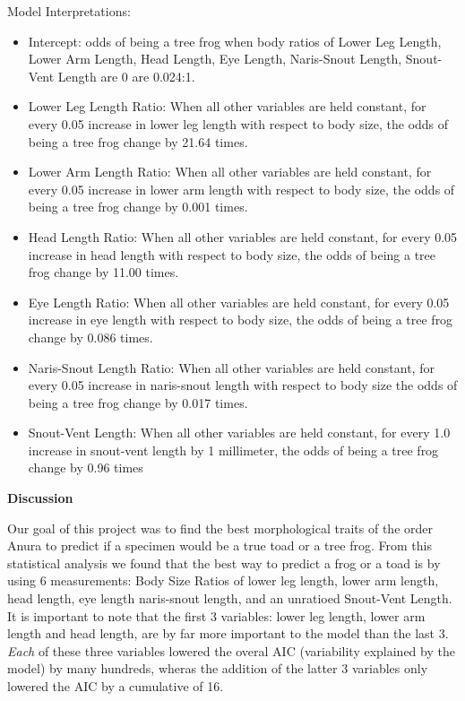 \documentclass[
]{article}
\begin{document}
Model Interpretations:

\begin{itemize}
\item
  Intercept: odds of being a tree frog when body ratios of Lower Leg
  Length, Lower Arm Length, Head Length, Eye Length, Naris-Snout Length,
  Snout-Vent Length are 0 are 0.024:1.
\item
  Lower Leg Length Ratio: When all other variables are held constant,
  for every 0.05 increase in lower leg length with respect to body size,
  the odds of being a tree frog change by 21.64 times.
\item
  Lower Arm Length Ratio: When all other variables are held constant,
  for every 0.05 increase in lower arm length with respect to body size,
  the odds of being a tree frog change by 0.001 times.
\item
  Head Length Ratio: When all other variables are held constant, for
  every 0.05 increase in head length with respect to body size, the odds
  of being a tree frog change by 11.00 times.
\item
  Eye Length Ratio: When all other variables are held constant, for
  every 0.05 increase in eye length with respect to body size, the odds
  of being a tree frog change by 0.086 times.
\item
  Naris-Snout Length Ratio: When all other variables are held constant,
  for every 0.05 increase in naris-snout length with respect to body
  size the odds of being a tree frog change by 0.017 times.
\item
  Snout-Vent Length: When all other variables are held constant, for
  every 1.0 increase in snout-vent length by 1 millimeter, the odds of
  being a tree frog change by 0.96 times
\end{itemize}

\textbf{Discussion}

Our goal of this project was to find the best morphological traits of
the order Anura to predict if a specimen would be a true toad or a tree
frog. From this statistical analysis we found that the best way to
predict a frog or a toad is by using 6 measurements: Body Size Ratios of
lower leg length, lower arm length, head length, eye length naris-snout
length, and an unratioed Snout-Vent Length. It is important to note that
the first 3 variables: lower leg length, lower arm length and head
length, are by far more important to the model than the last 3.
\emph{Each} of these three variables lowered the overal AIC (variability
explained by the model) by many hundreds, wheras the addition of the
latter 3 variables only lowered the AIC by a cumulative of 16.
\end{document}
